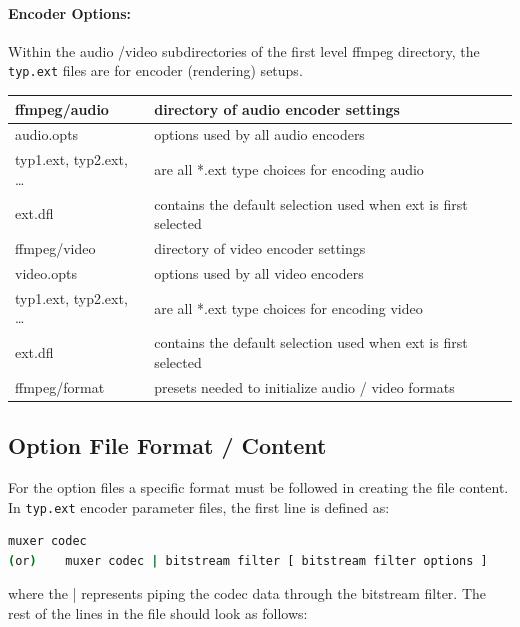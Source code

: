 \paragraph{Encoder Options:} Within the audio /video subdirectories of the first level ffmpeg directory, the \texttt{typ.ext} files are for encoder (rendering) setups.

\begin{center}
    \begin{longtable}{l l}
        \toprule
        ffmpeg/audio & directory of audio encoder settings \\
        \midrule
        audio.opts & options used by all audio encoders \\
        typ1.ext, typ2.ext, … & are all *.ext type choices for encoding audio \\
        ext.dfl & contains the default selection used when ext is first selected \\
        \midrule
        ffmpeg/video & directory of video encoder settings \\
        \midrule
        video.opts & options used by all video encoders \\
        typ1.ext, typ2.ext, … & are all *.ext type choices for encoding video \\
        ext.dfl & contains the default selection used when ext is first selected \\
        \midrule
        ffmpeg/format & presets needed to initialize audio / video formats \\
        \bottomrule
    \end{longtable}
\end{center}

\subsection{Option File Format / Content}%
\label{sub:option_file_format_content}

For the option files a specific format must be followed in creating the file content.
In \texttt{typ.ext} encoder parameter files, the first line is defined as:

\begin{lstlisting}[language=bash]
      muxer codec
(or) 	muxer codec | bitstream filter [ bitstream filter options ]
\end{lstlisting}

where the | represents piping the codec data through the bitstream filter. The rest of the lines in the file should look as follows:

